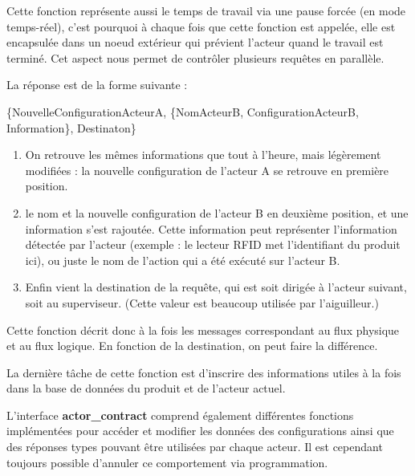 \documentclass[12pt,a4paper]{article}
\begin{document}
	 	Cette fonction représente aussi le temps de travail via une pause
	 	forcée (en mode temps-réel), c'est pourquoi à chaque fois que cette 
	 	fonction est appelée,
	 	elle est encapsulée dans un noeud extérieur qui prévient l'acteur 
	 	quand le travail est terminé. Cet aspect nous permet de contrôler 
	 	plusieurs requêtes en parallèle.

	 	La réponse est de la forme suivante :

	 	\{NouvelleConfigurationActeurA, 
	 	\{NomActeurB, ConfigurationActeurB, Information\},
	 	Destinaton\}

	 	\begin{enumerate}
	 		\item On retrouve les mêmes informations que tout à l'heure, mais 
	 			légèrement modifiées : la nouvelle configuration de l'acteur A 
	 			se retrouve en première position.
	 		\item le nom et la nouvelle configuration de l'acteur B en deuxième 
	 			position, et une information s'est rajoutée. Cette information 
	 			peut représenter l'information détectée par l'acteur (exemple : 
	 			le lecteur RFID met l'identifiant du produit ici), ou juste le 
	 			nom de l'action qui a été exécuté sur l'acteur B.
	 		\item Enfin vient la destination de la requête, qui est soit dirigée 
	 			à l'acteur suivant, soit au superviseur. (Cette valeur est 
	 			beaucoup utilisée par l'aiguilleur.)
	 	\end{enumerate}

	 	Cette fonction décrit donc à la fois les messages correspondant au
	 	flux physique et au flux logique. En fonction de la destination, 
	 	on peut faire la différence.

	 	La dernière tâche de cette fonction est d'inscrire des informations 
	 	utiles à la fois dans la base de données du produit et de l'acteur
	 	actuel.

		L'interface \textbf{actor\_contract} comprend également différentes 
		fonctions implémentées pour accéder et modifier les données des 
		configurations ainsi que des réponses types pouvant être utilisées 
		par chaque acteur. Il est cependant toujours possible d'annuler ce 
		comportement via programmation.
	 
\end{document}

